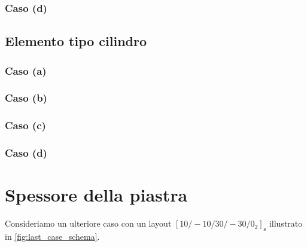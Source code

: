 \documentclass[a4paper,num-refs]{oup-contemporary}
\begin{document}
\subsubsection{Caso (d)}
\textcolor{blue}{\lipsum[1-2]}

\subsection{Elemento tipo cilindro}

\subsubsection{Caso (a)}
\textcolor{blue}{\lipsum[1-2]}
\subsubsection{Caso (b)}
\textcolor{blue}{\lipsum[1-2]}
\subsubsection{Caso (c)}
\textcolor{blue}{\lipsum[1-2]}
\subsubsection{Caso (d)}
\textcolor{blue}{\lipsum[1-2]}


\section{Spessore della piastra}

Consideriamo un ulteriore caso con un layout $[10 /-10 / 30 /-30 / 0_2]_{\mathrm{s}}$ illustrato in \cref{fig:last_case_schema}. 
\end{document}
